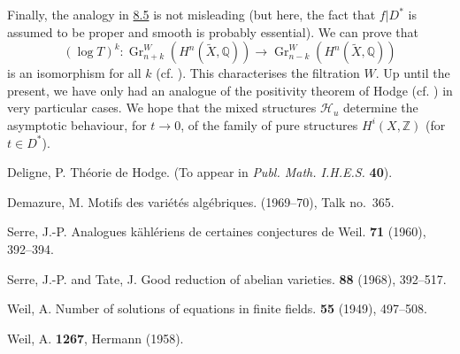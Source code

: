 \documentclass{article}
\theoremstyle{plain}
\theoremstyle{definition}
\newcommand{\ZZ}{\mathbb{Z}}
\newcommand{\QQ}{\mathbb{Q}}
\DeclareMathOperator{\Gr}{Gr}
\begin{document}
Finally, the analogy in \hyperref[8.5]{8.5} is not misleading (but here, the fact that $f|D^*$ is assumed to be proper and smooth is probably essential).
We can prove that
\[
  (\log T)^k\colon \Gr_{n+k}^W(H^n(\widetilde{X},\QQ)) \to \Gr_{n-k}^W(H^n(\widetilde{X},\QQ))
\]
is an isomorphism for all $k$ (cf. \cite[IV~6, Corollary to Theorem~5]{6}).
This characterises the filtration $W$.
Up until the present, we have only had an analogue of the positivity theorem of Hodge (cf. \cite[IV~7, Corollary to Theorem~7]{6}) in very particular cases.
We hope that the mixed structures $\mathscr{H}_u$ determine the asymptotic behaviour, for $t\to0$, of the family of pure structures $H^i(X,\ZZ)$ (for $t\in D^*$).



\nocite{*}

\begin{thebibliography}{6}

  {\sc Deligne, P.}
  \newblock Th\'{e}orie de Hodge.
  \newblock (To appear in {\em Publ. Math. I.H.E.S.} \textbf{40}).

  {\sc Demazure, M.}
  \newblock Motifs des vari\'{e}t\'{e}s alg\'{e}briques.
   (1969--70), Talk no.~365.

  {\sc Serre, J.-P.}
  \newblock Analogues k\"{a}hl\'{e}riens de certaines conjectures de Weil.
   \textbf{71} (1960), 392--394.

  {\sc Serre, J.-P. and Tate, J.}
  \newblock Good reduction of abelian varieties.
   \textbf{88} (1968), 392--517.

  {\sc Weil, A.}
  \newblock Number of solutions of equations in finite fields.
   \textbf{55} (1949), 497--508.

  {\sc Weil, A.}
   \textbf{1267}, Hermann (1958).

\end{thebibliography}
\end{document}
